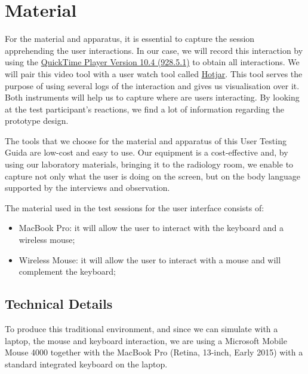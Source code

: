 \section{Material}

For the material and apparatus, it is essential to capture the session apprehending the user interactions. In our case, we will record this interaction by using the \hyperlink{https://support.apple.com/quicktime}{QuickTime Player Version 10.4 (928.5.1)} to obtain all interactions. We will pair this video tool with a user watch tool called \hyperlink{https://www.hotjar.com/}{Hotjar}. This tool serves the purpose of using several logs of the interaction and gives us visualisation over it. Both instruments will help us to capture where are users interacting. By looking at the test participant's reactions, we find a lot of information regarding the prototype design.

The tools that we choose for the material and apparatus of this User Testing Guida are low-cost and easy to use. Our equipment is a cost-effective and, by using our laboratory materials, bringing it to the radiology room, we enable to capture not only what the user is doing on the screen, but on the body language supported by the interviews and observation.

\hfill

The material used in the test sessions for the user interface consists of:

\hfill

\begin{itemize}
  \item MacBook Pro: it will allow the user to interact with the keyboard and a wireless mouse;
  \item Wireless Mouse: it will allow the user to interact with a mouse and will complement the keyboard;
\end{itemize}

\hfill

\clearpage

\subsection{Technical Details}

To produce this traditional environment, and since we can simulate with a laptop, the mouse and keyboard interaction, we are using a Microsoft Mobile Mouse 4000 together with the MacBook Pro (Retina, 13-inch, Early 2015) with a standard integrated keyboard on the laptop.